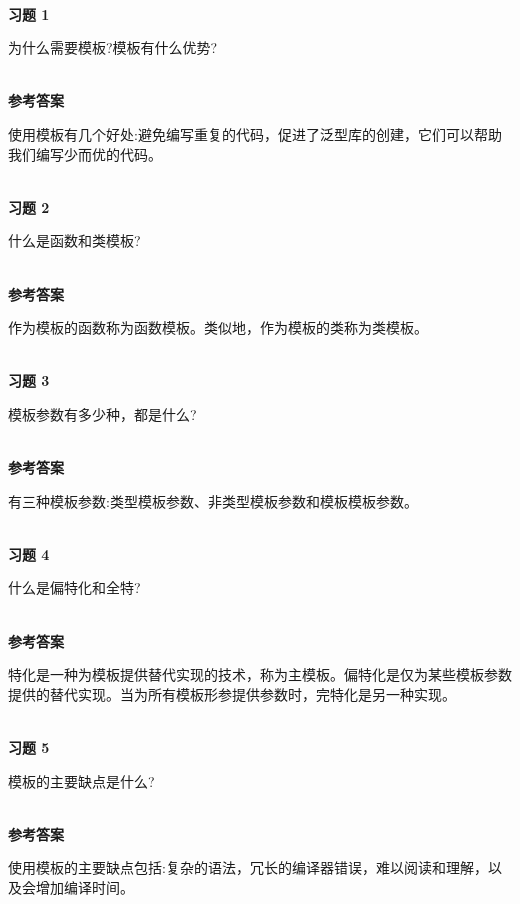 
\hspace*{\fill} \\ %
\noindent
\textbf{习题 1}

为什么需要模板?模板有什么优势?

\hspace*{\fill} \\ %
\noindent
\textbf{参考答案}

使用模板有几个好处:避免编写重复的代码，促进了泛型库的创建，它们可以帮助我们编写少而优的代码。

\hspace*{\fill} \\ %
\noindent
\textbf{习题 2}

什么是函数和类模板?

\hspace*{\fill} \\ %
\noindent
\textbf{参考答案}

作为模板的函数称为函数模板。类似地，作为模板的类称为类模板。

\hspace*{\fill} \\ %
\noindent
\textbf{习题 3}

模板参数有多少种，都是什么?

\hspace*{\fill} \\ %
\noindent
\textbf{参考答案}

有三种模板参数:类型模板参数、非类型模板参数和模板模板参数。

\hspace*{\fill} \\ %
\noindent
\textbf{习题 4}

什么是偏特化和全特?

\hspace*{\fill} \\ %
\noindent
\textbf{参考答案}

特化是一种为模板提供替代实现的技术，称为主模板。偏特化是仅为某些模板参数提供的替代实现。当为所有模板形参提供参数时，完特化是另一种实现。

\hspace*{\fill} \\ %
\noindent
\textbf{习题 5}

模板的主要缺点是什么?

\hspace*{\fill} \\ %
\noindent
\textbf{参考答案}

使用模板的主要缺点包括:复杂的语法，冗长的编译器错误，难以阅读和理解，以及会增加编译时间。



